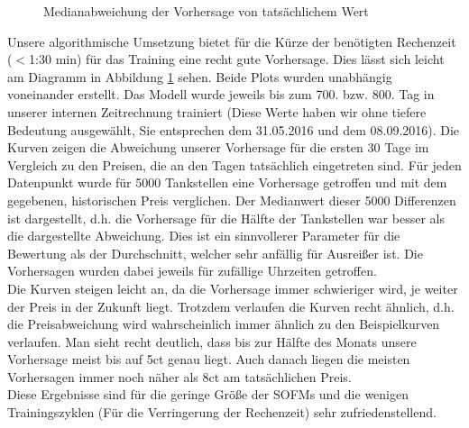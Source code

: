 \documentclass[11pt]{article}
\begin{document}
	\begin{figure}
		\centering
		\caption{Medianabweichung der Vorhersage von tatsächlichem Wert}
		\label{Median}
	\end{figure}

	Unsere algorithmische Umsetzung bietet für die Kürze der benötigten Rechenzeit ($<$1:30 min) für das Training eine recht gute Vorhersage. Dies lässt sich leicht am Diagramm in Abbildung \ref{Median} sehen. Beide Plots wurden unabhängig voneinander erstellt. Das Modell wurde jeweils bis zum 700. bzw. 800. Tag in unserer internen Zeitrechnung trainiert (Diese Werte haben wir ohne tiefere Bedeutung ausgewählt, Sie entsprechen dem 31.05.2016 und dem 08.09.2016). Die Kurven zeigen die Abweichung unserer Vorhersage für die ersten 30 Tage im Vergleich zu den Preisen, die an den Tagen tatsächlich eingetreten sind. Für jeden Datenpunkt wurde für 5000 Tankstellen eine Vorhersage getroffen und mit dem gegebenen, historischen Preis verglichen. Der Medianwert dieser 5000 Differenzen ist dargestellt, d.h. die Vorhersage für die Hälfte der Tankstellen war besser als die dargestellte Abweichung. Dies ist ein sinnvollerer Parameter für die Bewertung als der Durchschnitt, welcher sehr anfällig für Ausreißer ist. Die Vorhersagen wurden dabei jeweils für zufällige Uhrzeiten getroffen.\\
	Die Kurven steigen leicht an, da die Vorhersage immer schwieriger wird, je weiter der Preis in der Zukunft liegt. Trotzdem verlaufen die Kurven recht ähnlich, d.h. die Preisabweichung wird wahrscheinlich immer ähnlich zu den Beispielkurven verlaufen. Man sieht recht deutlich, dass bis zur Hälfte des Monats unsere Vorhersage meist bis auf 5ct genau liegt. Auch danach liegen die meisten Vorhersagen immer noch näher als 8ct am tatsächlichen Preis.\\
	Diese Ergebnisse sind für die geringe Größe der SOFMs und die wenigen Trainingszyklen (Für die Verringerung der Rechenzeit) sehr zufriedenstellend. 
\end{document}
